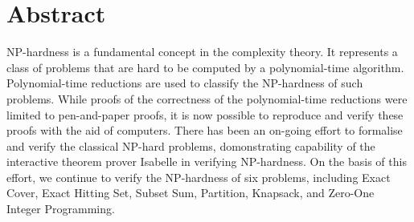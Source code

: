 \newcommand{\abstractname}{Abstract}


\chapter{\abstractname}
NP-hardness is a fundamental concept in the complexity theory. It represents a class of problems that 
are hard to be computed by a polynomial-time algorithm. Polynomial-time reductions are used 
to classify the NP-hardness of such problems. While proofs of the correctness of the polynomial-time reductions 
were limited to pen-and-paper proofs, 
it is now possible to reproduce and verify these proofs with the aid of computers. 
There has been an on-going effort to formalise and verify the classical NP-hard problems, 
domonstrating capability of the interactive theorem prover Isabelle in verifying NP-hardness.
On the basis of this effort, we continue to verify the NP-hardness of six problems, 
including Exact Cover, Exact Hitting Set, Subset Sum, Partition, Knapsack, and Zero-One Integer Programming.